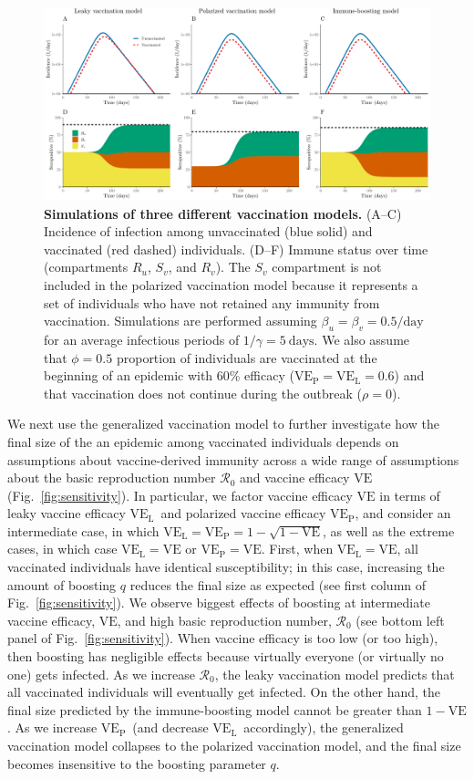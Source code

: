 \documentclass[12pt]{article}
\newcommand{\fref}[1]{Fig.~\ref{fig:#1}}
\newcommand{\VE}{\ensuremath{\mathrm{VE}}}
\newcommand{\VEP}{\ensuremath{\VE_{\mathrm{P}}}}
\newcommand{\VEL}{\ensuremath{\VE_{\mathrm{L}}}}
\begin{document}
\begin{figure}[!th]
\includegraphics[width=\textwidth]{outputs/figure_simulation_compare.Rout.tikz.pdf}
\caption{
\textbf{Simulations of three different vaccination models.}
(A--C) Incidence of infection among unvaccinated (blue solid) and vaccinated (red dashed) individuals.
(D--F) Immune status over time (compartments $R_u$, $S_v$, and $R_v$).
The $S_v$ compartment is not included in the polarized vaccination model because it represents a set of individuals who have not retained any immunity from vaccination.
Simulations are performed assuming $\beta_u = \beta_v =0.5/\mathrm{day}$ for an average infectious periods of $1/\gamma=5~\mathrm{days}$.
We also assume that $\phi = 0.5$ proportion of individuals are vaccinated at the beginning of an epidemic with 60\% efficacy ($\VEP=\VEL=0.6$) and that vaccination does not continue during the outbreak ($\rho = 0$).
\label{fig:simulation}
}
\end{figure}

We next use the generalized vaccination model to further investigate how the final size of the an epidemic among vaccinated individuals depends on assumptions about vaccine-derived immunity across a wide range of assumptions about the basic reproduction number $\mathcal R_0$ and vaccine efficacy $\VE$ (\fref{sensitivity}).
In particular, we factor vaccine efficacy $\VE$ in terms of leaky vaccine efficacy \VEL\ and polarized vaccine efficacy \VEP, and consider an intermediate case, in which $\VEL = \VEP = 1 - \sqrt{1-\VE}$, as well as the extreme cases, in which case $\VEL = \VE$ or $\VEP = \VE$.
First, when $\VEL = \VE$, all vaccinated individuals have identical susceptibility;
in this case, increasing the amount of boosting $q$ reduces the final size as expected (see first column of \fref{sensitivity}).
We observe biggest effects of boosting at intermediate vaccine efficacy, $\VE$, and high basic reproduction number, $\mathcal R_0$ (see bottom left panel of \fref{sensitivity}).
When vaccine efficacy is too low (or too high), then boosting has negligible effects because virtually everyone (or virtually no one) gets infected.
As we increase $\mathcal R_0$, the leaky vaccination model predicts that all vaccinated individuals will eventually get infected.
On the other hand, the final size predicted by the immune-boosting model cannot be greater than $1-\VE$.
As we increase \VEP\ (and decrease \VEL\ accordingly), the generalized vaccination model collapses to the polarized vaccination model, and the final size becomes insensitive to the boosting parameter $q$.
\end{document}
